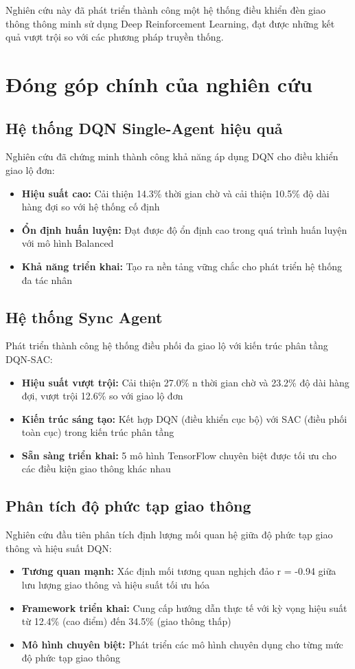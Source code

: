 Nghiên cứu này đã phát triển thành công một hệ thống điều khiển đèn giao thông thông minh sử dụng Deep Reinforcement Learning, đạt được những kết quả vượt trội so với các phương pháp truyền thống.

\section{Đóng góp chính của nghiên cứu}

\subsection{Hệ thống DQN Single-Agent hiệu quả}
Nghiên cứu đã chứng minh thành công khả năng áp dụng DQN cho điều khiển giao lộ đơn:
\begin{itemize}
    \item \textbf{Hiệu suất cao:} Cải thiện 14.3\% thời gian chờ và cải thiện 10.5\% độ dài hàng đợi so với hệ thống cố định
    \item \textbf{Ổn định huấn luyện:} Đạt được độ ổn định cao trong quá trình huấn luyện với mô hình Balanced
    \item \textbf{Khả năng triển khai:} Tạo ra nền tảng vững chắc cho phát triển hệ thống đa tác nhân
\end{itemize}

\subsection{Hệ thống Sync Agent}
Phát triển thành công hệ thống điều phối đa giao lộ với kiến trúc phân tầng DQN-SAC:
\begin{itemize}
    \item \textbf{Hiệu suất vượt trội:} Cải thiện 27.0\% n thời gian chờ và 23.2\% độ dài hàng đợi, vượt trội 12.6\% so với giao lộ đơn
    \item \textbf{Kiến trúc sáng tạo:} Kết hợp DQN (điều khiển cục bộ) với SAC (điều phối toàn cục) trong kiến trúc phân tầng
    \item \textbf{Sẵn sàng triển khai:} 5 mô hình TensorFlow chuyên biệt được tối ưu cho các điều kiện giao thông khác nhau
\end{itemize}

\subsection{Phân tích độ phức tạp giao thông}
Nghiên cứu đầu tiên phân tích định lượng mối quan hệ giữa độ phức tạp giao thông và hiệu suất DQN:
\begin{itemize}
    \item \textbf{Tương quan mạnh:} Xác định mối tương quan nghịch đảo r = -0.94 giữa lưu lượng giao thông và hiệu suất tối ưu hóa
    \item \textbf{Framework triển khai:} Cung cấp hướng dẫn thực tế với kỳ vọng hiệu suất từ 12.4\% (cao điểm) đến 34.5\% (giao thông thấp)
    \item \textbf{Mô hình chuyên biệt:} Phát triển các mô hình chuyên dụng cho từng mức độ phức tạp giao thông
\end{itemize}




